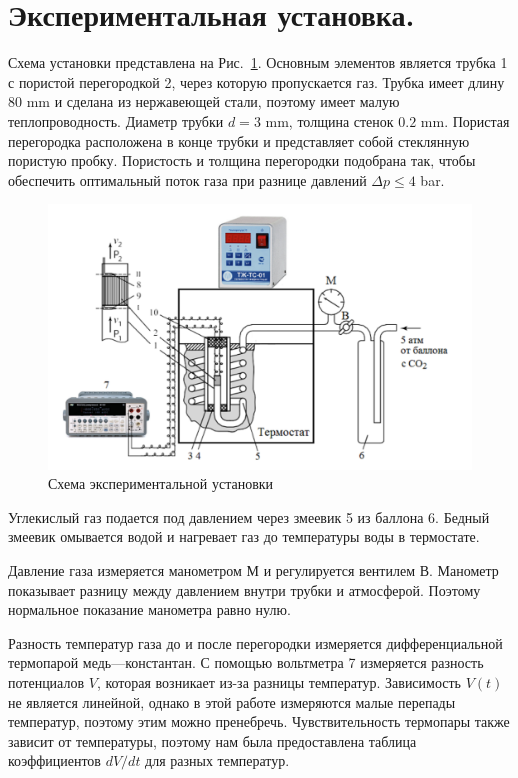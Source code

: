 \documentclass[a4paper,12pt]{report}
\begin{document}
    \section{Экспериментальная установка.}
        Схема установки представлена на Рис.~\ref{fig:1}. Основным элементов является трубка 1 с пористой перегородкой 2, через которую пропускается газ. Трубка имеет длину 80 mm и сделана из нержавеющей стали, поэтому имеет малую теплопроводность. Диаметр трубки $d=3$ mm, толщина стенок $0.2$ mm. Пористая перегородка расположена в конце трубки и представляет собой стеклянную пористую пробку. Пористость и толщина перегородки подобрана так, чтобы обеспечить оптимальный поток газа при разнице давлений $\Delta p \leq 4$ bar.
        \begin{figure}[H]
            \centering
            \includegraphics[width=0.9\linewidth]{../img/ustanovka.png}
            \caption{Схема экспериментальной установки}
            \label{fig:1}
        \end{figure}
        Углекислый газ подается под давлением через змеевик 5 из баллона 6. Бедный змеевик омывается водой и нагревает газ до температуры воды в термостате.

        Давление газа измеряется манометром М и регулируется вентилем В. Манометр показывает разницу между давлением внутри трубки и атмосферой. Поэтому нормальное показание манометра равно нулю.

        Разность температур газа до и после перегородки измеряется дифференциальной термопарой медь---константан. С помощью вольтметра 7 измеряется разность потенциалов $V$, которая возникает из-за разницы температур. Зависимость $V(t)$ не является линейной, однако в этой работе измеряются малые перепады температур, поэтому этим можно пренебречь. Чувствительность термопары также зависит от температуры, поэтому нам была предоставлена таблица коэффициентов $dV/dt$ для разных температур.
    
\end{document}
